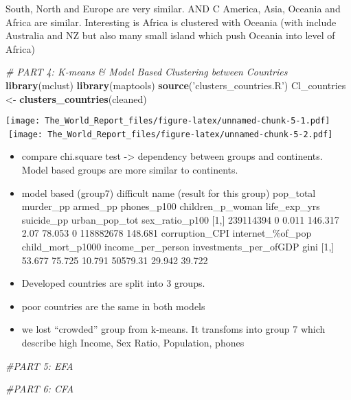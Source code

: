 \documentclass[]{article}
\newenvironment{Shaded}{\begin{snugshade}}{\end{snugshade}}
\newcommand{\KeywordTok}[1]{\textcolor[rgb]{0.13,0.29,0.53}{\textbf{#1}}}
\newcommand{\StringTok}[1]{\textcolor[rgb]{0.31,0.60,0.02}{#1}}
\newcommand{\CommentTok}[1]{\textcolor[rgb]{0.56,0.35,0.01}{\textit{#1}}}
\newcommand{\NormalTok}[1]{#1}
\begin{document}
South, North and Europe are very similar. AND C America, Asia, Oceania
and Africa are similar. Interesting is Africa is clustered with Oceania
(with include Australia and NZ but also many small island which push
Oceania into level of Africa)

\begin{Shaded}
\begin{Highlighting}[]
\CommentTok{# PART 4: K-means & Model Based Clustering between Countries}
\KeywordTok{library}\NormalTok{(mclust)}
\KeywordTok{library}\NormalTok{(maptools)}
\KeywordTok{source}\NormalTok{(}\StringTok{'clusters_countries.R'}\NormalTok{)}
\NormalTok{Cl_countries <-}\StringTok{ }\KeywordTok{clusters_countries}\NormalTok{(cleaned)}
\end{Highlighting}
\end{Shaded}

\texttt{[image: The\_World\_Report\_files/figure-latex/unnamed-chunk-5-1.pdf]}
\texttt{[image: The\_World\_Report\_files/figure-latex/unnamed-chunk-5-2.pdf]}

\begin{itemize}
\item
  compare chi.square test -\textgreater{} dependency between groups and
  continents. Model based groups are more similar to continents.
\item
  model based (group7) difficult name (result for this group) pop\_total
  murder\_pp armed\_pp phones\_p100 children\_p\_woman life\_exp\_yrs
  suicide\_pp urban\_pop\_tot sex\_ratio\_p100 {[}1,{]} 239114394 0
  0.011 146.317 2.07 78.053 0 118882678 148.681 corruption\_CPI
  internet\_\%of\_pop child\_mort\_p1000 income\_per\_person
  investments\_per\_ofGDP gini {[}1,{]} 53.677 75.725 10.791 50579.31
  29.942 39.722
\item
  Developed countries are split into 3 groups.
\item
  poor countries are the same in both models
\item
  we lost ``crowded'' group from k-means. It transfoms into group 7
  which describe high Income, Sex Ratio, Population, phones
\end{itemize}

\begin{Shaded}
\begin{Highlighting}[]
\CommentTok{#PART 5: EFA}
\end{Highlighting}
\end{Shaded}

\begin{Shaded}
\begin{Highlighting}[]
\CommentTok{#PART 6: CFA}
\end{Highlighting}
\end{Shaded}
\end{document}
